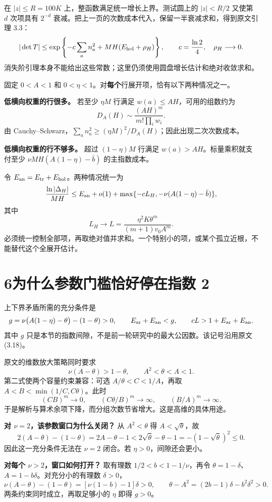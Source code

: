 \documentclass[11pt,a4paper]{article}
\begin{document}
在 $|z|\le R=100K$ 上，整函数满足统一增长上界。测试圆上的 $|z|<R/2$ 又使第 $d$ 次项具有 $2^{-d}$ 衰减。把上一页的次数成本代入，保留一半衰减求和，得到原文引理 3.3：
\[
 |\det T|\le \exp\left\{-c\sum_a n_a^2+MH(E_{\rm hol}+\rho_H)\right\},
 \qquad c=\frac{\ln2}{4},\quad\rho_H\longrightarrow0.
\]
消失阶引理本身不能给出这些常数；这里仍须使用圆盘增长估计和绝对收敛求和。

固定 $0<A<1$ 和 $0<\eta<1$。对\textbf{每个}行展开项，恰有以下两种情况之一。

\textbf{低横向权重的行很多。} 若至少 $\eta M$ 行满足 $w(a)\le AH$，可用的组数约为
\[
 D_A(H)\sim\frac{(AH)^m}{m!\prod_iw_i}.
\]
由 Cauchy--Schwarz，$\sum_an_a^2\ge(\eta M)^2/D_A(H)$；因此出现二次次数成本。

\textbf{低横向权重的行不够多。} 超过 $(1-\eta)M$ 行满足 $w(a)>AH$。标量乘积就支付至少
$\nu MH(A(1-\eta)-\bar b)$ 的主指数成本。

令 $E_{\rm an}=E_{\rm tr}+E_{\rm hol}$。两种情况统一为
\[
 \frac{\ln|\Delta_H|}{MH}\le E_{\rm an}+o(1)
 +\max\{-cL_H,-\nu(A(1-\eta)-\bar b)\},
\]
其中
\[
 L_H\longrightarrow L=\frac{\eta^2K\theta^m}{(m+1)v_0A^m}.
\]
必须统一控制全部项，再取绝对值并求和。一个特别小的项，或某个孤立近根，不能替代这个全展开估计。

\newpage
\section*{6\quad 为什么参数门槛恰好停在指数 2}
上下界矛盾所需的充分条件是
\[
 g=\nu\bigl(A(1-\eta)-\theta\bigr)-(1-\theta)>0,
 \qquad E_{\rm ar}+E_{\rm an}<g,
 \qquad cL>1+E_{\rm ar}+E_{\rm an}.
\]
其中 $g$ 只是本节的指数间隙，不是前一轮研究中的最大公因数。该记号沿用原文 (3.18)。

原文的维数放大策略同时要求
\[
 \nu(A-\theta)>1-\theta,\qquad A^2<\theta< A<1.
\]
第二式使两个容量约束兼容：可选
$A/\theta<C<1/A$，再取 $A<B<\min(1/C,C\theta)$。此时
\[
 (CB)^m\to0,\qquad(C\theta/B)^m\to\infty,\qquad(B/A)^m\to\infty.
\]
于是解析与算术余项下降，而分组次数节省增大。这是高维的具体用途。

\textbf{对 $\nu=2$，该参数窗口为什么关闭？} 从 $A^2<\theta$ 得 $A<\sqrt\theta$，故
\[
 2(A-\theta)-(1-\theta)
 =2A-\theta-1
 <2\sqrt\theta-\theta-1
 =-(1-\sqrt\theta)^2\le0.
\]
因此这一充分条件无法在 $\nu=2$ 闭合。若 $\eta>0$，间隙还会更小。

\textbf{对每个 $\nu>2$，窗口如何打开？} 取有理数
$1/2<b<1-1/\nu$，再令 $\theta=1-\delta$、$A=1-b\delta$。对充分小的有理数 $\delta>0$，
\[
 \nu(A-\theta)-(1-\theta)=[\nu(1-b)-1]\delta>0,
 \qquad\theta-A^2=(2b-1)\delta-b^2\delta^2>0.
\]
两条约束同时成立，再取足够小的 $\eta$ 即得 $g>0$。
\end{document}
